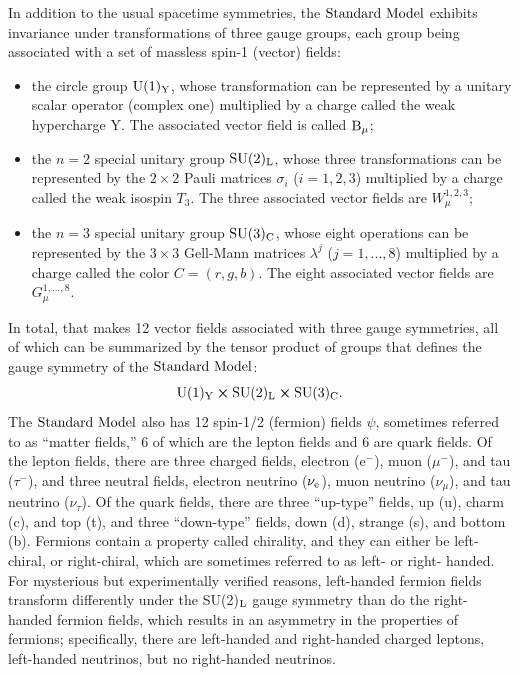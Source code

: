 In addition to the usual spacetime symmetries, the $\text{Standard\ Model}$ exhibits invariance under transformations of three gauge groups, each group being associated with a set of massless spin-1 (vector) fields:
\begin{itemize}
\item the circle group $\rm U(1)_{Y}$, whose transformation can be represented by a unitary scalar operator (complex one) multiplied by a charge called the weak hypercharge Y. The associated vector field is called ${\rm B}_{\mu}$;
\item the $n=2$ special unitary group $\rm SU(2)_{L}$, whose three transformations can be represented by the $2\times2$ Pauli matrices $\sigma_{i}$ ($i=1,2,3$) multiplied by a charge called the weak isospin $T_3$. The three associated vector fields are $W_{\mu}^{1,2,3}$;
\item the $n=3$ special unitary group $\rm SU(3)_{C}$, whose eight operations can be represented by the $3\times3$ Gell-Mann matrices $\lambda^{j}$ ($j=1,...,8$) multiplied by a charge called the color $C=(r,g,b)$. The eight associated vector fields are $G_{\mu}^{1,...,8}$.
\end{itemize}
In total, that makes 12 vector fields associated with three gauge symmetries, all of which can be summarized by the tensor product of groups that defines the gauge symmetry of the $\text{Standard\ Model}$:
\begin{equation}
\rm U(1)_{Y} \cross \rm SU(2)_{L} \cross \rm SU(3)_{C}.
\label{eq:symm}
\end{equation}
The $\text{Standard\ Model}$ also has 12 spin-1/2 (fermion) fields $\psi$, sometimes referred to as ``matter fields,'' 6 of which are the lepton fields and 6 are quark fields.  Of the lepton fields, there are three charged fields, electron (e$^-$), muon ($\mu^-$), and tau ($\tau^-$), and three neutral fields, electron neutrino ($\nu_{\rm e}$), muon neutrino ($\nu_{\mu}$), and tau neutrino ($\nu_{\tau}$). Of the quark fields, there are three ``up-type'' fields, up (u), charm (c), and top (t), and three ``down-type'' fields, down (d), strange (s), and bottom (b). Fermions contain a property called chirality, and they can either be left-chiral, or right-chiral, which are sometimes referred to as left- or right- handed. For mysterious but experimentally verified reasons, left-handed fermion fields transform differently under the SU(2)$_{\rm L}$ gauge symmetry than do the right-handed fermion fields, which results in an asymmetry in the properties of fermions; specifically, there are left-handed and right-handed charged leptons, left-handed neutrinos, but no right-handed neutrinos.

